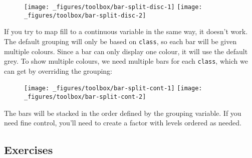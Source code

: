 \begin{Shaded}
\begin{Highlighting}[]
\OperatorTok{+}\StringTok{ }
\StringTok{  }\NormalTok{()}
\OperatorTok{+}\StringTok{ }
\StringTok{  }\NormalTok{()}
\end{Highlighting}
\end{Shaded}

\begin{figure}[H]
  \texttt{[image: \_figures/toolbox/bar-split-disc-1]}%
  \texttt{[image: \_figures/toolbox/bar-split-disc-2]}
\end{figure}

If you try to map fill to a continuous variable in the same way, it
doesn't work. The default grouping will only be based on \texttt{class},
so each bar will be given multiple colours. Since a bar can only display
one colour, it will use the default grey. To show multiple colours, we
need multiple bars for each \texttt{class}, which we can get by
overriding the grouping:

\begin{Shaded}
\begin{Highlighting}[]
\OperatorTok{+}\StringTok{ }
\StringTok{  }\NormalTok{()}
\OperatorTok{+}\StringTok{ }
\StringTok{  }\NormalTok{()}
\end{Highlighting}
\end{Shaded}

\begin{figure}[H]
  \texttt{[image: \_figures/toolbox/bar-split-cont-1]}%
  \texttt{[image: \_figures/toolbox/bar-split-cont-2]}
\end{figure}

The bars will be stacked in the order defined by the grouping variable.
If you need fine control, you'll need to create a factor with levels
ordered as needed.

\hypertarget{exercises-1}{%
\subsection{Exercises}\label{exercises-1}}

